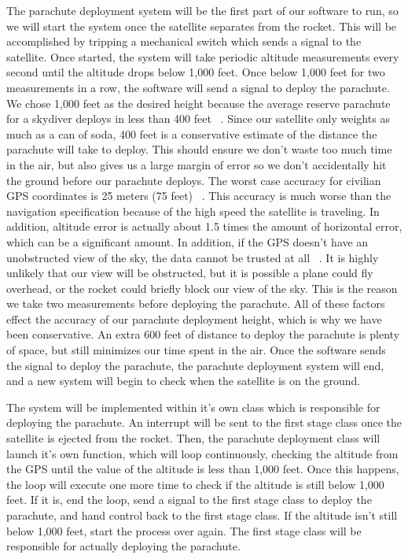 \documentclass[10pt,letterpaper,onecolumn,journal]{IEEEtran}
\begin{document}
The parachute deployment system will be the first part of our software to run, so we will start the system once the satellite separates from the rocket. This will be accomplished by tripping a mechanical switch which sends a signal to the satellite. Once started, the system will take periodic altitude measurements every second until the altitude drops below 1,000 feet. Once below 1,000 feet for two measurements in a row, the software will send a signal to deploy the parachute. We chose 1,000 feet as the desired height because the average reserve parachute for a skydiver deploys in less than 400 feet ~\cite{scott}. Since our satellite only weights as much as a can of soda, 400 feet is a conservative estimate of the distance the parachute will take to deploy. This should ensure we don’t waste too much time in the air, but also gives us a large margin of error so we don’t accidentally hit the ground before our parachute deploys. The worst case accuracy for civilian GPS coordinates is 25 meters (75 feet) ~\cite{mehaffey}. This accuracy is much worse than the navigation specification because of the high speed the satellite is traveling. In addition, altitude error is actually about 1.5 times the amount of horizontal error, which can be a significant amount. In addition, if the GPS doesn’t have an unobstructed view of the sky, the data cannot be trusted at all ~\cite{mehaffey}. It is highly unlikely that our view will be obstructed, but it is possible a plane could fly overhead, or the rocket could briefly block our view of the sky. This is the reason we take two measurements before deploying the parachute. All of these factors effect the accuracy of our parachute deployment height, which is why we have been conservative. An extra 600 feet of distance to deploy the parachute is plenty of space, but still minimizes our time spent in the air. Once the software sends the signal to deploy the parachute, the parachute deployment system will end, and a new system will begin to check when the satellite is on the ground.\vspace{.3cm}
\par
The system will be implemented within it’s own class which is responsible for deploying the parachute. An interrupt will be sent to the first stage class once the satellite is ejected from the rocket. Then, the parachute deployment class will launch it’s own function, which will loop continuously, checking the altitude from the GPS until the value of the altitude is less than 1,000 feet. Once this happens, the loop will execute one more time to check if the altitude is still below 1,000 feet. If it is, end the loop, send a signal to the first stage class to deploy the parachute, and hand control back to the first stage class. If the altitude isn’t still below 1,000 feet, start the process over again. The first stage class will be responsible for actually deploying the parachute.\vspace{.3cm}
\par
\end{document}
